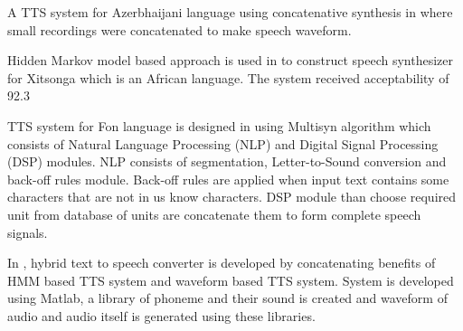 A TTS system for Azerbhaijani language using concatenative
synthesis in \cite{aida2010main} where small recordings were concatenated to make speech waveform.


Hidden Markov model based approach is used in \cite{baloyi2012text} to construct
speech synthesizer for Xitsonga which is an African language. The system received acceptability
of 92.3%


TTS system for Fon language is designed in \cite{dagba2014text} using Multisyn algorithm
which consists of Natural Language Processing (NLP) and Digital Signal Processing (DSP)
modules. NLP consists of segmentation, Letter-to-Sound conversion and back-off rules module.
Back-off rules are applied when input text contains some characters that are not in us know
characters. DSP module than choose required unit from database of units are concatenate them to
form complete speech signals.


In \cite{ganai2016text}, hybrid text to speech converter is developed by
concatenating benefits of HMM based TTS system and waveform based TTS system. System is
developed using Matlab, a library of phoneme and their sound is created and waveform of audio
and audio itself is generated using these libraries.























